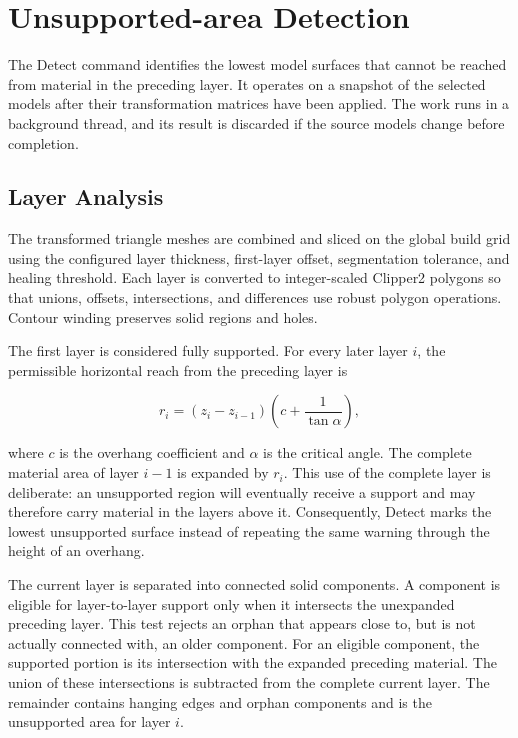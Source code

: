 
\chapter{Unsupported-area Detection}
\label{chap:detect}

The Detect command identifies the lowest model surfaces that cannot be reached
from material in the preceding layer. It operates on a snapshot of the
selected models after their transformation matrices have been applied. The
work runs in a background thread, and its result is discarded if the source
models change before completion.

\section{Layer Analysis}

The transformed triangle meshes are combined and sliced on the global build
grid using the configured layer thickness, first-layer offset, segmentation
tolerance, and healing threshold. Each layer is converted to integer-scaled
Clipper2 polygons so that unions, offsets, intersections, and differences use
robust polygon operations. Contour winding preserves solid regions and holes.

The first layer is considered fully supported. For every later layer $i$,
the permissible horizontal reach from the preceding layer is

\[
    r_i = (z_i-z_{i-1})
          \left(c + \frac{1}{\tan\alpha}\right),
\]

where $c$ is the overhang coefficient and $\alpha$ is the critical angle.
The complete material area of layer $i-1$ is expanded by $r_i$. This use of
the complete layer is deliberate: an unsupported region will eventually
receive a support and may therefore carry material in the layers above it.
Consequently, Detect marks the lowest unsupported surface instead of repeating
the same warning through the height of an overhang.

The current layer is separated into connected solid components. A component
is eligible for layer-to-layer support only when it intersects the unexpanded
preceding layer. This test rejects an orphan that appears close to, but is not
actually connected with, an older component. For an eligible component, the
supported portion is its intersection with the expanded preceding material.
The union of these intersections is subtracted from the complete current
layer. The remainder contains hanging edges and orphan components and is the
unsupported area for layer $i$.

